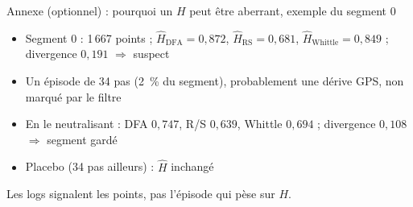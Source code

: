 \documentclass[aspectratio=169,11pt]{beamer}
\begin{document}
\begin{frame}{Annexe (optionnel) : pourquoi un $H$ peut être aberrant, exemple du segment 0}
\small
\begin{itemize}
  \item Segment 0 : 1\,667 points ; $\hat H_{\mathrm{DFA}}=0{,}872$, $\hat H_{\mathrm{RS}}=0{,}681$, $\hat H_{\mathrm{Whittle}}=0{,}849$ ; divergence $0{,}191$ \(\Rightarrow\) \alert{suspect}
  \item Un épisode de 34 pas (2~\% du segment), probablement une dérive GPS, non marqué par le filtre
  \item En le neutralisant : DFA $0{,}747$, R/S $0{,}639$, Whittle $0{,}694$ ; divergence $0{,}108$ \(\Rightarrow\) segment gardé
  \item Placebo (34 pas ailleurs) : $\hat H$ inchangé
\end{itemize}
\medskip
Les logs signalent les points, pas l'épisode qui pèse sur $H$.
\end{frame}
\end{document}
